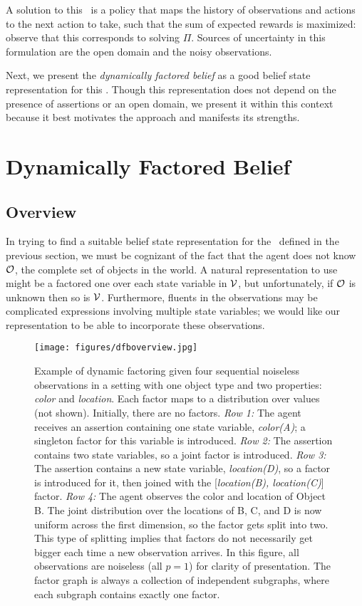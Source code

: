 A solution to this \pomdp\ is a policy that maps the history of
observations and actions to the next action to take, such that the sum
of expected rewards is maximized: observe that this corresponds to
solving $\Pi$. Sources of uncertainty in this formulation are the open
domain and the noisy observations.

Next, we present the \emph{dynamically factored belief} as a good
belief state representation for this \pomdp. Though this
representation does not depend on the presence of assertions or an
open domain, we present it within this context because it best
motivates the approach and manifests its strengths.

\section{Dynamically Factored Belief}
\subsection{Overview}
In trying to find a suitable belief state representation for the
\pomdp\ defined in the previous section, we must be cognizant of the
fact that the agent does not know $\mathcal{O}$, the complete set of objects
in the world. A natural representation to use might be a factored one
over each state variable in $\mathcal{V}$, but unfortunately, if $\mathcal{O}$ is unknown
then so is $\mathcal{V}$. Furthermore, fluents in the observations may be
complicated expressions involving multiple state variables; we would
like our representation to be able to incorporate these observations.

\begin{figure}[t]
  \vspace{0.6em}
  \centering
    \noindent
    \texttt{[image: figures/dfboverview.jpg]}
    \caption{Example of dynamic factoring given four sequential
      noiseless observations in a setting with one object type and two
      properties: \emph{color} and \emph{location}. Each factor maps
      to a distribution over values (not shown). Initially, there are
      no factors. \emph{Row 1:} The agent receives an assertion
      containing one state variable, \emph{color(A)}; a singleton
      factor for this variable is introduced. \emph{Row 2:} The
      assertion contains two state variables, so a joint factor is
      introduced. \emph{Row 3:} The assertion contains a new state
      variable, \emph{location(D)}, so a factor is introduced for it,
      then joined with the [\emph{location(B), location(C)}]
      factor. \emph{Row 4:} The agent observes the color and location
      of Object B. The joint distribution over the locations of B, C,
      and D is now uniform across the first dimension, so the factor
      gets split into two. This type of splitting implies that factors
      do not necessarily get bigger each time a new observation
      arrives. In this figure, all observations are noiseless (all
      $p=1$) for clarity of presentation. The factor graph is always a
      collection of independent subgraphs, where each subgraph
      contains exactly one factor.}
  \label{fig:dfboverview}
\end{figure}

